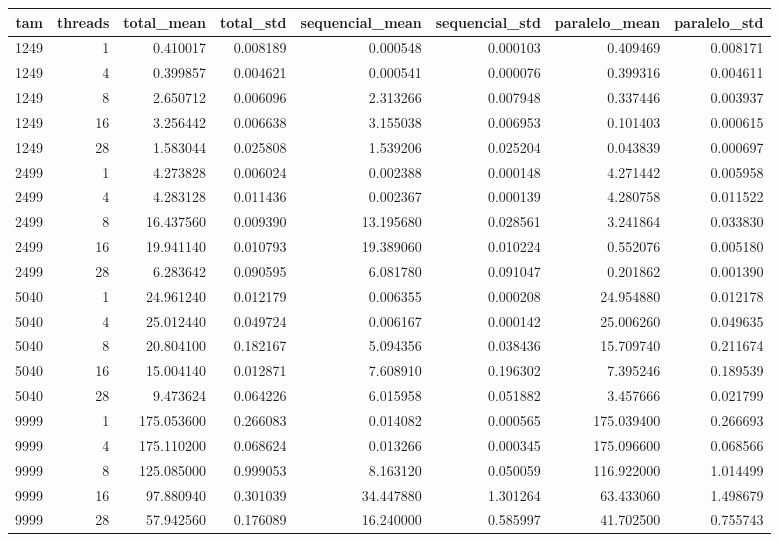 \begin{tabular}{rrrrrrrr}
\toprule
tam & threads & total_mean & total_std & sequencial_mean & sequencial_std & paralelo_mean & paralelo_std \\
\midrule
1249 & 1 & 0.410017 & 0.008189 & 0.000548 & 0.000103 & 0.409469 & 0.008171 \\
1249 & 4 & 0.399857 & 0.004621 & 0.000541 & 0.000076 & 0.399316 & 0.004611 \\
1249 & 8 & 2.650712 & 0.006096 & 2.313266 & 0.007948 & 0.337446 & 0.003937 \\
1249 & 16 & 3.256442 & 0.006638 & 3.155038 & 0.006953 & 0.101403 & 0.000615 \\
1249 & 28 & 1.583044 & 0.025808 & 1.539206 & 0.025204 & 0.043839 & 0.000697 \\
2499 & 1 & 4.273828 & 0.006024 & 0.002388 & 0.000148 & 4.271442 & 0.005958 \\
2499 & 4 & 4.283128 & 0.011436 & 0.002367 & 0.000139 & 4.280758 & 0.011522 \\
2499 & 8 & 16.437560 & 0.009390 & 13.195680 & 0.028561 & 3.241864 & 0.033830 \\
2499 & 16 & 19.941140 & 0.010793 & 19.389060 & 0.010224 & 0.552076 & 0.005180 \\
2499 & 28 & 6.283642 & 0.090595 & 6.081780 & 0.091047 & 0.201862 & 0.001390 \\
5040 & 1 & 24.961240 & 0.012179 & 0.006355 & 0.000208 & 24.954880 & 0.012178 \\
5040 & 4 & 25.012440 & 0.049724 & 0.006167 & 0.000142 & 25.006260 & 0.049635 \\
5040 & 8 & 20.804100 & 0.182167 & 5.094356 & 0.038436 & 15.709740 & 0.211674 \\
5040 & 16 & 15.004140 & 0.012871 & 7.608910 & 0.196302 & 7.395246 & 0.189539 \\
5040 & 28 & 9.473624 & 0.064226 & 6.015958 & 0.051882 & 3.457666 & 0.021799 \\
9999 & 1 & 175.053600 & 0.266083 & 0.014082 & 0.000565 & 175.039400 & 0.266693 \\
9999 & 4 & 175.110200 & 0.068624 & 0.013266 & 0.000345 & 175.096600 & 0.068566 \\
9999 & 8 & 125.085000 & 0.999053 & 8.163120 & 0.050059 & 116.922000 & 1.014499 \\
9999 & 16 & 97.880940 & 0.301039 & 34.447880 & 1.301264 & 63.433060 & 1.498679 \\
9999 & 28 & 57.942560 & 0.176089 & 16.240000 & 0.585997 & 41.702500 & 0.755743 \\
\bottomrule
\end{tabular}
